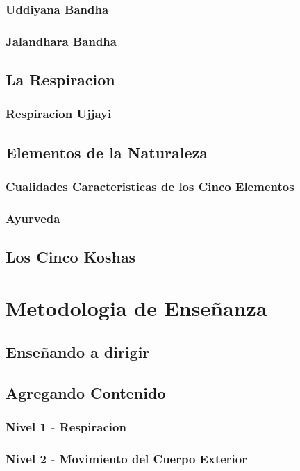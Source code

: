 \documentclass[a4paper]{article}
\begin{document}
\subsubsection{Uddiyana Bandha}
\subsubsection{Jalandhara Bandha}
\subsection{La Respiracion}
\subsubsection{Respiracion Ujjayi}
\subsection{Elementos de la Naturaleza}
\subsubsection{Cualidades Caracteristicas de los Cinco Elementos}
\subsubsection{Ayurveda}
\subsection{Los Cinco Koshas}

\section{Metodologia de Enseñanza}
\subsection{Enseñando a dirigir}
\subsection{Agregando Contenido}
\subsubsection{Nivel 1 - Respiracion}
\subsubsection{Nivel 2 - Movimiento del Cuerpo Exterior}
\end{document}
